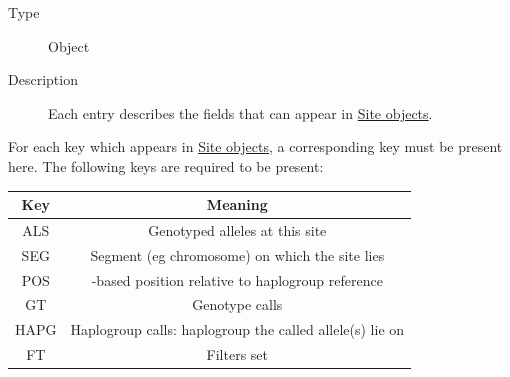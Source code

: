 \begin{description}
\item[Type]
Object
\item[Description]
Each entry describes the fields that can appear in
\protect\hyperlink{site_obj}{Site objects}.
\end{description}

For each key which appears in \protect\hyperlink{site_obj}{Site
objects}, a corresponding key must be present here. The following keys
are required to be present:

\begin{longtable}[]{@{}cc@{}}
\toprule
\begin{minipage}[b]{0.16\columnwidth}\centering
Key\strut
\end{minipage} & \begin{minipage}[b]{0.64\columnwidth}\centering
Meaning\strut
\end{minipage}\tabularnewline
\midrule
\endhead
\begin{minipage}[t]{0.16\columnwidth}\centering
ALS\strut
\end{minipage} & \begin{minipage}[t]{0.64\columnwidth}\centering
Genotyped alleles at this site\strut
\end{minipage}\tabularnewline
\begin{minipage}[t]{0.16\columnwidth}\centering
SEG\strut
\end{minipage} & \begin{minipage}[t]{0.64\columnwidth}\centering
Segment (eg chromosome) on which the site lies\strut
\end{minipage}\tabularnewline
\begin{minipage}[t]{0.16\columnwidth}\centering
POS\strut
\end{minipage} & \begin{minipage}[t]{0.64\columnwidth}\centering
1-based position relative to haplogroup reference\strut
\end{minipage}\tabularnewline
\begin{minipage}[t]{0.16\columnwidth}\centering
GT\strut
\end{minipage} & \begin{minipage}[t]{0.64\columnwidth}\centering
Genotype calls\strut
\end{minipage}\tabularnewline
\begin{minipage}[t]{0.16\columnwidth}\centering
HAPG\strut
\end{minipage} & \begin{minipage}[t]{0.64\columnwidth}\centering
Haplogroup calls: haplogroup the called allele(s) lie on\strut
\end{minipage}\tabularnewline
\begin{minipage}[t]{0.16\columnwidth}\centering
FT\strut
\end{minipage} & \begin{minipage}[t]{0.64\columnwidth}\centering
Filters set\strut
\end{minipage}\tabularnewline
\bottomrule
\end{longtable}

